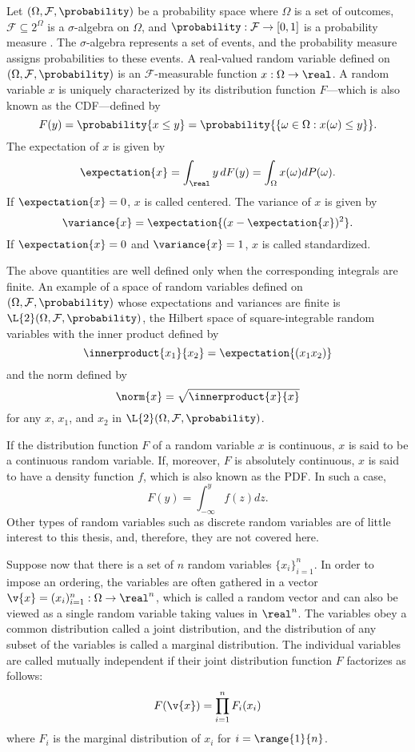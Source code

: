 Let $(\Omega, \mathcal{F}, \probability)$ be a probability space where $\Omega$
is a set of outcomes, $\mathcal{F} \subseteq 2^\Omega$ is a $\sigma$-algebra on
$\Omega$, and $\probability: \mathcal{F} \to [0, 1]$ is a probability measure
\cite{durrett2010}. The $\sigma$-algebra represents a set of events, and the
probability measure assigns probabilities to these events. A real-valued random
variable defined on $(\Omega, \mathcal{F}, \probability)$ is an
$\mathcal{F}$-measurable function $x: \Omega \to \real$. A random variable $x$
is uniquely characterized by its distribution function $F$---which is also known
as the \acf{CDF}---defined by
\begin{equation*}
  F(y) = \probability{x \leq y} = \probability{\{ \omega \in \Omega: x(\omega) \leq y \}}.
\end{equation*}
The expectation of $x$ is given by
\[
  \expectation{x} = \int_\real y \, dF(y) = \int_\Omega x(\omega) dP(\omega).
\]
If $\expectation{x} = 0$, $x$ is called centered. The variance of $x$ is given
by
\[
  \variance{x} = \expectation{(x - \expectation{x})^2}.
\]
If $\expectation{x} = 0$ and $\variance{x} = 1$, $x$ is called standardized.

The above quantities are well defined only when the corresponding integrals are
finite. An example of a space of random variables defined on $(\Omega,
\mathcal{F}, \probability)$ whose expectations and variances are finite is
$\L{2}(\Omega, \mathcal{F}, \probability)$, the Hilbert space of
square-integrable random variables \cite{janson1997} with the inner product
defined by
\[
  \innerproduct{x_1}{x_2} = \expectation{(x_1 x_2)}
\]
and the norm defined by
\[
  \norm{x} = \sqrt{\innerproduct{x}{x}}
\]
for any $x$, $x_1$, and $x_2$ in $\L{2}(\Omega, \mathcal{F}, \probability)$.

If the distribution function $F$ of a random variable $x$ is continuous, $x$ is
said to be a continuous random variable. If, moreover, $F$ is absolutely
continuous, $x$ is said to have a density function $f$, which is also known as
the \acf{PDF}. In such a case,
\[
  F(y) = \int_{-\infty}^y f(z) dz.
\]
Other types of random variables such as discrete random variables are of little
interest to this thesis, and, therefore, they are not covered here.

Suppose now that there is a set of $n$ random variables $\{ x_i \}_{i = 1}^n$.
In order to impose an ordering, the variables are often gathered in a vector
$\v{x} = (x_i)_{i = 1}^n: \Omega \to \real^n$, which is called a random vector
and can also be viewed as a single random variable taking values in $\real^n$.
The variables obey a common distribution called a joint distribution, and the
distribution of any subset of the variables is called a marginal distribution.
The individual variables are called mutually independent if their joint
distribution function $F$ factorizes as follows:
\[
  F(\v{x}) = \prod_{i = 1}^n F_i(x_i)
\]
where $F_i$ is the marginal distribution of $x_i$ for $i = \range{1}{n}$.

